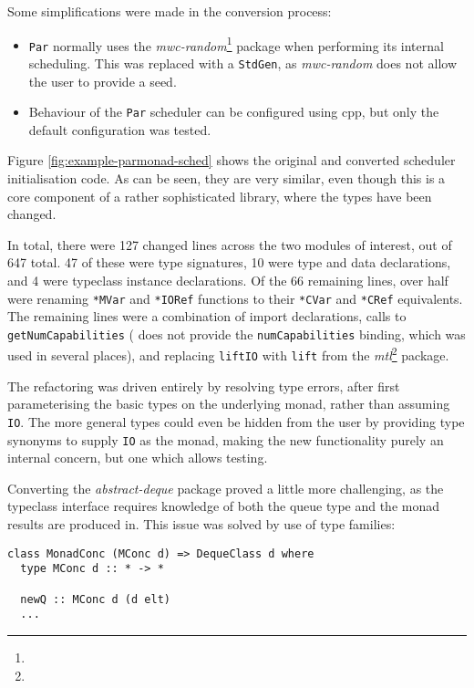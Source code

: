 Some simplifications were made in the conversion process:

\begin{itemize}
\item \verb|Par| normally uses the
  \emph{mwc-random}\footnote{} package when
  performing its internal scheduling. This was replaced with a
  \verb|StdGen|, as \emph{mwc-random} does not allow the user to
  provide a seed.

\item Behaviour of the \verb|Par| scheduler can be configured using
  cpp, but only the default configuration was tested.
\end{itemize}

Figure \ref{fig:example-parmonad-sched} shows the original and
converted scheduler initialisation code. As can be seen, they are very
similar, even though this is a core component of a rather
sophisticated library, where the types have been changed.

In total, there were 127 changed lines across the two modules of
interest, out of 647 total. 47 of these were type signatures, 10 were
type and data declarations, and 4 were typeclass instance
declarations. Of the 66 remaining lines, over half were renaming
\verb|*MVar| and \verb|*IORef| functions to their \verb|*CVar| and
\verb|*CRef| equivalents. The remaining lines were a combination of
import declarations, calls to \verb|getNumCapabilities| (\dejafu{}
does not provide the \verb|numCapabilities| binding, which was used in
several places), and replacing \verb|liftIO| with \verb|lift| from the
\emph{mtl}\footnote{} package.

The refactoring was driven entirely by resolving type errors, after
first parameterising the basic types on the underlying monad, rather
than assuming \verb|IO|. The more general types could even be hidden
from the user by providing type synonyms to supply \verb|IO| as the
monad, making the new functionality purely an internal concern, but
one which allows testing.

Converting the \emph{abstract-deque} package proved a little more
challenging, as the typeclass interface requires knowledge of both the
queue type and the monad results are produced in. This issue was
solved by use of type families:

\begin{verbatim}
class MonadConc (MConc d) => DequeClass d where
  type MConc d :: * -> *

  newQ :: MConc d (d elt)
  ...
\end{verbatim}

